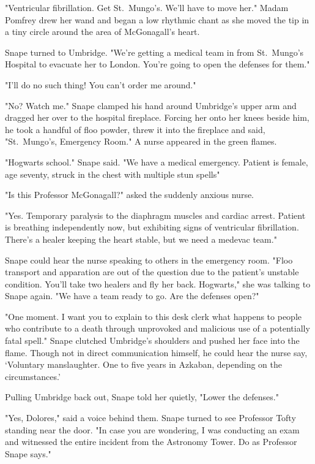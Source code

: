 "Ventricular fibrillation. Get St.~Mungo's. We'll have to move her." Madam Pomfrey drew her wand and began a low rhythmic chant as she moved the tip in a tiny circle around the area of McGonagall's heart.

Snape turned to Umbridge. "We're getting a medical team in from St.~Mungo's Hospital to evacuate her to London. You're going to open the defenses for them."

"I'll do no such thing! You can't order me around."

"No? Watch me." Snape clamped his hand around Umbridge's upper arm and dragged her over to the hospital fireplace. Forcing her onto her knees beside him, he took a handful of floo powder, threw it into the fireplace and said, "St.~Mungo's, Emergency Room." A nurse appeared in the green flames.

"Hogwarts school." Snape said. "We have a medical emergency. Patient is female, age seventy, struck in the chest with multiple stun spells{\el}"

"Is this Professor McGonagall?" asked the suddenly anxious nurse.

"Yes. Temporary paralysis to the diaphragm muscles and cardiac arrest. Patient is breathing independently now, but exhibiting signs of ventricular fibrillation. There's a healer keeping the heart stable, but we need a medevac team."

Snape could hear the nurse speaking to others in the emergency room. "Floo transport and apparation are out of the question due to the patient's unstable condition. You'll take two healers and fly her back. Hogwarts," she was talking to Snape again. "We have a team ready to go. Are the defenses open?"

"One moment. I want you to explain to this desk clerk what happens to people who contribute to a death through unprovoked and malicious use of a potentially fatal spell." Snape clutched Umbridge's shoulders and pushed her face into the flame. Though not in direct communication himself, he could hear the nurse say, `Voluntary manslaughter. One to five years in Azkaban, depending on the circumstances.'

Pulling Umbridge back out, Snape told her quietly, "Lower the defenses."

"Yes, Dolores," said a voice behind them. Snape turned to see Professor Tofty standing near the door. "In case you are wondering, I was conducting an exam and witnessed the entire incident from the Astronomy Tower. Do as Professor Snape says."

